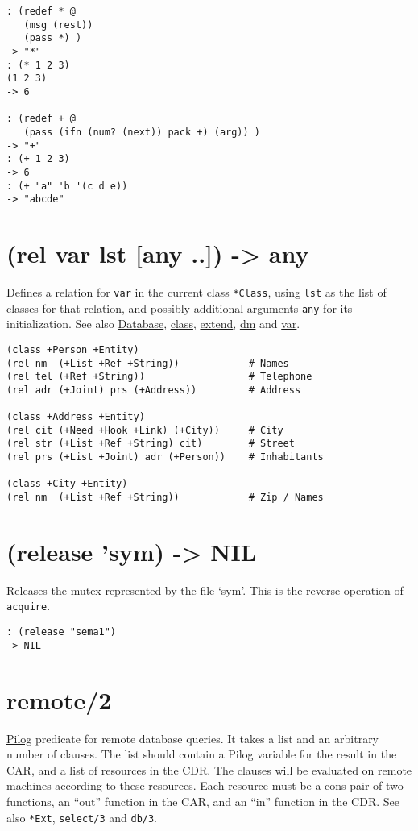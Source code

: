{{{{{{{{\begin{verbatim}
: (redef * @
   (msg (rest))
   (pass *) )
-> "*"
: (* 1 2 3)
(1 2 3)
-> 6

: (redef + @
   (pass (ifn (num? (next)) pack +) (arg)) )
-> "+"
: (+ 1 2 3)
-> 6
: (+ "a" 'b '(c d e))
-> "abcde"
\end{verbatim}

 
\section{(rel var lst [any ..]) -> any}
\label{sec-8-1-18-15}


Defines a relation for \texttt{var} in the current class \texttt{*Class}, using \texttt{lst}
as the list of classes for that relation, and possibly additional
arguments \texttt{any} for its initialization. See also
\hyperref[ref.html-dbase]{Database}, \hyperref[refC.html-class]{class},
\hyperref[refE.html-extend]{extend}, \hyperref[refD.html-dm]{dm} and
\hyperref[refV.html-var]{var}.


\begin{verbatim}
(class +Person +Entity)
(rel nm  (+List +Ref +String))            # Names
(rel tel (+Ref +String))                  # Telephone
(rel adr (+Joint) prs (+Address))         # Address

(class +Address +Entity)
(rel cit (+Need +Hook +Link) (+City))     # City
(rel str (+List +Ref +String) cit)        # Street
(rel prs (+List +Joint) adr (+Person))    # Inhabitants

(class +City +Entity)
(rel nm  (+List +Ref +String))            # Zip / Names
\end{verbatim}

 
\section{(release 'sym) -> NIL}
\label{sec-8-1-18-16}


Releases the mutex represented by the file `sym'. This is the reverse
operation of \texttt{acquire}.


\begin{verbatim}
: (release "sema1")
-> NIL
\end{verbatim}

 
\section{remote/2}
\label{sec-8-1-18-17}


\hyperref[ref.html-pilog]{Pilog} predicate for remote database queries. It
takes a list and an arbitrary number of clauses. The list should contain
a Pilog variable for the result in the CAR, and a list of resources in
the CDR. The clauses will be evaluated on remote machines according to
these resources. Each resource must be a cons pair of two functions, an
``out'' function in the CAR, and an ``in'' function in the CDR. See also
\texttt{*Ext}, \texttt{select/3} and \texttt{db/3}.


}}}}}}}}
